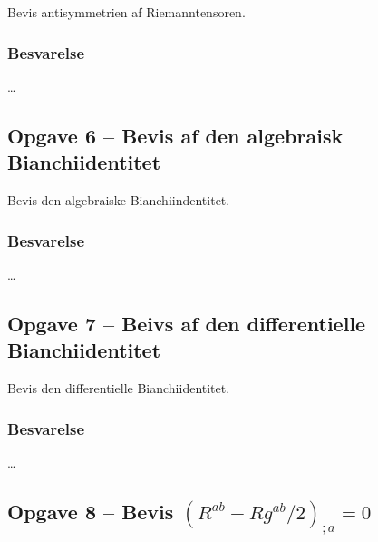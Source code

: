 \documentclass[../main.tex]{subfiles}
\begin{document}
Bevis antisymmetrien af Riemanntensoren.


\subsubsection{Besvarelse}

\ldots




\subsection{Opgave 6 -- Bevis af den algebraisk Bianchiidentitet}
\setcounter{subsection}{6}
\setcounter{equation}{0}

Bevis den algebraiske Bianchiindentitet.


\subsubsection{Besvarelse}

\ldots




\subsection{Opgave 7 -- Beivs af den differentielle Bianchiidentitet}
\setcounter{subsection}{7}
\setcounter{equation}{0}

Bevis den differentielle Bianchiidentitet.


\subsubsection{Besvarelse}

\ldots




\subsection{Opgave 8 -- Bevis $(R^{ab} - Rg^{ab}/2)_{;a} = 0$}
\setcounter{subsection}{8}
\setcounter{equation}{0}
\end{document}

